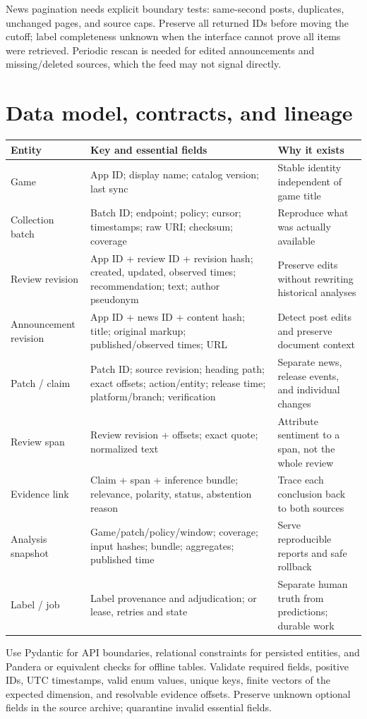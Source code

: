 \documentclass[10pt,letterpaper]{article}
\newcommand{\nextsection}[1]{\clearpage\section{#1}}
\begin{document}
News pagination needs explicit boundary tests: same-second posts, duplicates, unchanged pages, and source caps. Preserve all returned IDs before moving the cutoff; label completeness unknown when the interface cannot prove all items were retrieved. Periodic rescan is needed for edited announcements and missing/deleted sources, which the feed may not signal directly.

\nextsection{Data model, contracts, and lineage}
\begin{tabularx}{\linewidth}{p{1.28in}YY}
\toprule
Entity & Key and essential fields & Why it exists \\
\midrule
Game & App ID; display name; catalog version; last sync & Stable identity independent of game title \\
Collection batch & Batch ID; endpoint; policy; cursor; timestamps; raw URI; checksum; coverage & Reproduce what was actually available \\
Review revision & App ID + review ID + revision hash; created, updated, observed times; recommendation; text; author pseudonym & Preserve edits without rewriting historical analyses \\
Announcement revision & App ID + news ID + content hash; title; original markup; published/observed times; URL & Detect post edits and preserve document context \\
Patch / claim & Patch ID; source revision; heading path; exact offsets; action/entity; release time; platform/branch; verification & Separate news, release events, and individual changes \\
Review span & Review revision + offsets; exact quote; normalized text & Attribute sentiment to a span, not the whole review \\
Evidence link & Claim + span + inference bundle; relevance, polarity, status, abstention reason & Trace each conclusion back to both sources \\
Analysis snapshot & Game/patch/policy/window; coverage; input hashes; bundle; aggregates; published time & Serve reproducible reports and safe rollback \\
Label / job & Label provenance and adjudication; or lease, retries and state & Separate human truth from predictions; durable work \\
\bottomrule
\end{tabularx}

Use Pydantic for API boundaries, relational constraints for persisted entities, and Pandera or equivalent checks for offline tables. Validate required fields, positive IDs, UTC timestamps, valid enum values, unique keys, finite vectors of the expected dimension, and resolvable evidence offsets. Preserve unknown optional fields in the source archive; quarantine invalid essential fields.
\end{document}
